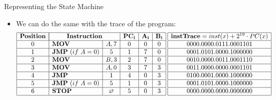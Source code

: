 \begin{frame}[allowframebreaks]{Representing the State Machine}
\begin{itemize}
\item We can do the same with the trace of the program:
\[
\begin{array}{|c|l|c|c|c|c|}
\hline
\mathbf{Position} & \multicolumn{2}{|c|}{\mathbf{Instruction}} & \mathbf{PC_i} & \mathbf{A_i} & \mathbf{B_i} \\ \hline
0 & \mathbf{MOV} & A, 7 & 0 & 0 & 0 \\ \hline
1 & \mathbf{JMP}~(if~A = 0) & 5 & 1 & 7 & 0 \\ \hline
2 & \mathbf{MOV} & B, 3 & 2 & 7 & 0 \\ \hline
3 & \mathbf{MOV} & A, 0 & 3 & 7 & 3 \\ \hline
4 & \mathbf{JMP} & 1 & 4 & 0 & 3 \\ \hline
5 & \mathbf{JMP}~(if~A = 0) & 5 & 1 & 0 & 3 \\ \hline
6 & \mathbf{STOP} & \emptyset & 5 & 0 & 3 \\ \hline
\end{array}
\hspace{0.1cm}
\begin{array}{|c|c|}
\hline
\mathbf{instTrace} = inst(x) + 2^{19} \cdot PC(x) \\ \hline
0000.0000.0111.0001101 \\ \hline
0001.0101.0000.1000000 \\ \hline
0010.0000.0011.0001110 \\ \hline
0011.0000.0000.0001101 \\ \hline
0100.0001.0000.1000000 \\ \hline
0001.0101.0000.1000000 \\ \hline
0000.0000.0000.0000000 \\ \hline
\end{array}
\]
\end{itemize}
\end{frame}













